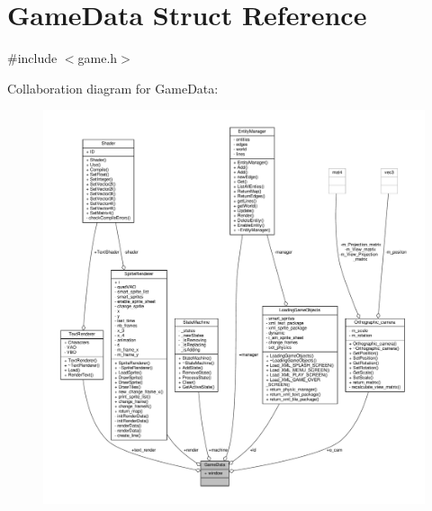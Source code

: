 \hypertarget{structGameData}{}\section{Game\+Data Struct Reference}
\label{structGameData}


{\ttfamily \#include $<$game.\+h$>$}



Collaboration diagram for Game\+Data\+:
\nopagebreak
\begin{figure}[H]
\begin{center}
\leavevmode
\includegraphics[width=350pt]{structGameData__coll__graph}
\end{center}
\end{figure}
